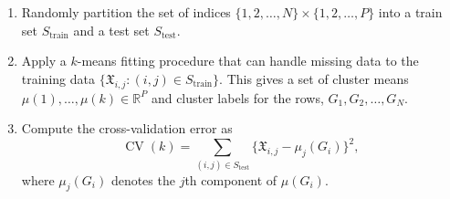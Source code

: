 \documentclass[12pt]{article}
\newcommand{\CV}{\operatorname{CV}}
\newcommand{\R}{\mathbb{R}}
\newcommand{\dataX}{\mathfrak{X}}
\begin{document}
\begin{enumerate}
  \item Randomly partition the set of indices $\{ 1, 2, \dotsc, N \} \times \{
    1, 2, \dotsc, P \}$ into a train set $S_\text{train}$ and a test set
    $S_\text{test}$.

  \item Apply a $k$-means fitting procedure that can handle missing data to
    the training data $\{ \dataX_{i,j} : (i,j) \in S_{\text{train}} \}$. This
    gives a set of cluster means $\mu(1), \dotsc, \mu(k) \in \R^P$ and
    cluster labels for the rows, $G_1, G_2, \dotsc, G_N$.

  \item Compute the cross-validation error as
    \[
      \CV(k) = \sum_{(i,j) \in S_{\text{test}}} \{ \dataX_{i,j} - \mu_j(G_i) \}^2,
    \]
    where $\mu_j(G_i)$ denotes the $j$th component of $\mu(G_i)$.
\end{enumerate}
\end{document}
